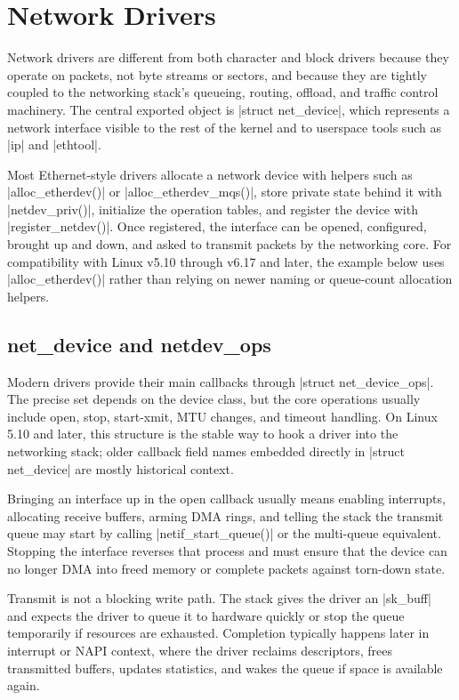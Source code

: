 \documentclass[10pt, oneside]{book}
\begin{document}

\section{Network Drivers}
\label{sec:network}
Network drivers are different from both character and block drivers because they
operate on packets, not byte streams or sectors, and because they are tightly
coupled to the networking stack's queueing, routing, offload, and traffic
control machinery.
The central exported object is \cpp|struct net_device|, which represents a
network interface visible to the rest of the kernel and to userspace tools such
as \sh|ip| and \sh|ethtool|.

Most Ethernet-style drivers allocate a network device with helpers such as
\cpp|alloc_etherdev()| or \cpp|alloc_etherdev_mqs()|, store private state behind it with
\cpp|netdev_priv()|, initialize the operation tables, and register the device
with \cpp|register_netdev()|.
Once registered, the interface can be opened, configured, brought up and down,
and asked to transmit packets by the networking core.
For compatibility with Linux v5.10 through v6.17 and later, the example below
uses \cpp|alloc_etherdev()| rather than relying on newer naming or queue-count
allocation helpers.

\subsection{net\_device and netdev\_ops}
\label{sec:net_device}
Modern drivers provide their main callbacks through \cpp|struct net_device_ops|.
The precise set depends on the device class, but the core operations usually
include open, stop, start-xmit, MTU changes, and timeout handling.
On Linux 5.10 and later, this structure is the stable way to hook a driver into the
networking stack; older callback field names embedded directly in
\cpp|struct net_device| are mostly historical context.

Bringing an interface up in the open callback usually means enabling interrupts,
allocating receive buffers, arming DMA rings, and telling the stack the transmit
queue may start by calling \cpp|netif_start_queue()| or the multi-queue
equivalent.
Stopping the interface reverses that process and must ensure that the device can
no longer DMA into freed memory or complete packets against torn-down state.

Transmit is not a blocking write path.
The stack gives the driver an \cpp|sk_buff| and expects the driver to queue it
to hardware quickly or stop the queue temporarily if resources are exhausted.
Completion typically happens later in interrupt or NAPI context, where the
driver reclaims descriptors, frees transmitted buffers, updates statistics, and
wakes the queue if space is available again.
\end{document}
